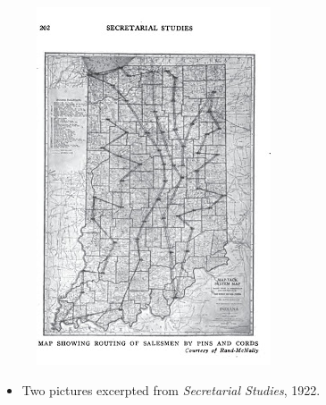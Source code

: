 \documentclass[mathserif]{beamer}
\begin{document}
{\begin{figure}
\begin{minipage}{1.5in}
        	\includegraphics[width=\textwidth]{TSP-Secretary2.jpg}
	\end{minipage}
    \end{figure}
\begin{itemize}
	\item Two pictures excerpted from {\it Secretarial Studies}, 1922. 
\end{itemize}
}
\end{document}
